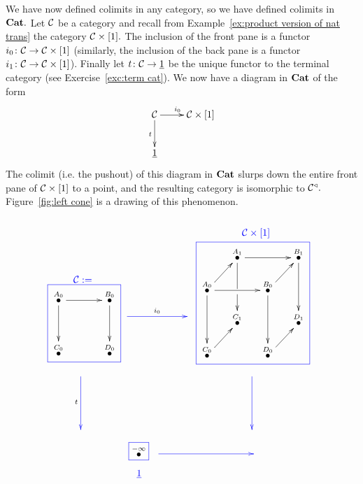 \documentclass[CT4S-EN-RU]{subfiles}
\begin{document}
\begin{exampleENG}
We have now defined colimits in any category, so we have defined colimits in ${\mathbf{Cat}}.$ Let $\mathcal{C}$ be a category and recall from Example~\ref{ex:product version of nat trans} the category $\mathcal{C}\times[1].$ The inclusion of the front pane is a functor $i_0\colon\mathcal{C}\rightarrow\mathcal{C}\times[1]$ (similarly, the inclusion of the back pane is a functor $i_1\colon\mathcal{C}\rightarrow\mathcal{C}\times[1]$). Finally let $t\colon\mathcal{C}\rightarrow\underline{1}$ be the unique functor to the terminal category (see Exercise~\ref{exc:term cat}). We now have a diagram in ${\mathbf{Cat}}$ of the form 
$$\xymatrix{\mcC\ar[r]^{i_0}\ar[d]_{t}&\mcC\times[1]\\\ul{1}}$$
The colimit (i.e. the pushout) of this diagram in ${\mathbf{Cat}}$ slurps down the entire front pane of $\mathcal{C}\times[1]$ to a point, and the resulting category is isomorphic to $\mathcal{C}^\triangleleft.$ Figure~\ref{fig:left cone} is a drawing of this phenomenon.
\begin{figure}[H]
$$
\parbox{1in}{~\vspace{.6in}\boxtitle{\color{blue}{$\mcC:=$}}\cfbox{blue}{\parbox{.7in}{\xymatrix@=15pt{
\LMO{A_0}\ar[rr]\ar[dd]&&\LMO{B_0}\ar[dd]\\\\\LMO{C_0}&&\LMO{D_0}
}}}}
\parbox{1.1in}{~\vspace{.6in}\\\xymatrix{~\ar@[blue][rr]^{i_0}&\hspace{.1in}&~}}
\parbox{1.7in}{\boxtitle{\color{blue}{$\mcC\times[1]$}}\cfbox{blue}{\parbox{1.4in}{\xymatrix@=15pt{
&\LMO{A_1}\ar[rr]\ar'[d][dd]&&\LMO{B_1}\ar[dd]\\
\LMO{A_0}\ar[ur]\ar[rr]\ar[dd]&&\LMO{B_0}\ar[ur]\ar[dd]\\
&\LMO{C_1}&&\LMO{D_1}\\
\LMO{C_0}\ar[ur]&&\LMO{D_0}\ar[ur]&
}}}}
$$
$$
\hspace{-.5in}\xymatrix{~\ar@[blue][dd]_t\\\\~}\hspace{2.3in}\xymatrix{~\ar@[blue][dd]\\\\~}
$$
$$
\hspace{.4in}\parbox{.3in}{\cfbox{blue}{$\LMO{-\infty}$}\begin{center}\color{blue}{$\ul{1}$}\end{center}}
\parbox{1.6in}{\xymatrix{~\ar@[blue][rr]&\hspace{.6in}&~}\vspace{.15in}~}
$$
\end{figure}
\end{exampleENG}
\end{document}
